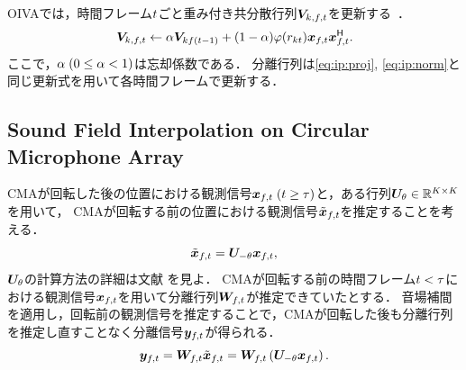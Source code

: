 \documentclass[sip,biber]{now-journal}
\begin{document}
OIVAでは，時間フレーム$t$ごと重み付き共分散行列$\cov _{\src,\ft}$を更新する~\cite{Taniguchi:2014:HSCMA}．
\begin{equation}
  \cov _{\src,\ft} \gets \forget \cov _{\src\freq(\tframe-1)} + (1 - \forget) \weight ({\var _{\src\tframe}}) \Obs _{\ft} \Obs _{\ft}^{\hermite}.
\end{equation}
ここで，$\alpha\; (0 \leq \alpha < 1)$は忘却係数である．
分離行列は\cref{eq:ip:proj}, \cref{eq:ip:norm}と同じ更新式を用いて各時間フレームで更新する．

\subsection{Sound Field Interpolation on Circular Microphone Array}

CMAが回転した後の位置における観測信号$\Obs _{\ft}\; (\tframe \geq \rotFra)$と，ある行列$\bm{U} _{\theta} \in \mathbb{R} ^{K\times K}$を用いて，
CMAが回転する前の位置における観測信号$\irot{\Obs} _{\ft}$を推定することを考える．
\begin{equation}
  \irot{\Obs} _{\ft} = \rotMat _{-\rotDeg} \Obs _{\ft},
\end{equation}
$\bm{U} _{\theta}$の計算方法の詳細は文献 \cite{Wakabayashi:2023:ASLP} を見よ．
CMAが回転する前の時間フレーム$t < \tau$における観測信号$\Obs _{\ft}$を用いて分離行列$\Demix _{\ft}$が推定できていたとする．
音場補間を適用し，回転前の観測信号を推定することで，CMAが回転した後も分離行列を推定し直すことなく分離信号$\Est _{\ft}$が得られる．
\begin{equation}
  \Est _{\ft} = \Demix _{\ft} \irot{\Obs} _{\ft} = \Demix _{\ft} \left(\rotMat _{-\rotDeg} \Obs _{\ft}\right).
\end{equation}


\end{document}
